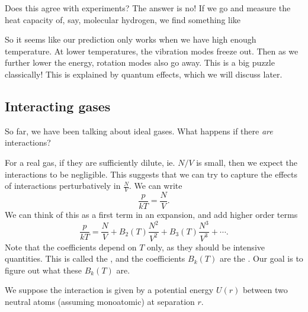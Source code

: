 \documentclass[a4paper]{article}
\begin{document}
Does this agree with experiments? The answer is no! If we go and measure the heat capacity of, say, molecular hydrogen, we find something like
\begin{center}
\end{center}
So it seems like our prediction only works when we have high enough temperature. At lower temperatures, the vibration modes freeze out. Then as we further lower the energy, rotation modes also go away. This is a big puzzle classically! This is explained by quantum effects, which we will discuss later.

\subsection{Interacting gases}
So far, we have been talking about ideal gases. What happens if there \emph{are} interactions?

For a real gas, if they are sufficiently dilute, ie. $N/V$ is small, then we expect the interactions to be negligible. This suggests that we can try to capture the effects of interactions perturbatively in $\frac{N}{V}$. We can write
\[
  \frac{p}{kT} = \frac{N}{V}.
\]
We can think of this as a first term in an expansion, and add higher order terms
\[
  \frac{p}{kT} = \frac{N}{V} + B_2(T) \frac{N^2}{V^2} + B_3 (T) \frac{N^3}{V^3} + \cdots.
\]
Note that the coefficients depend on $T$ only, as they should be intensive quantities. This is called the , and the coefficients $B_k(T)$ are the . Our goal is to figure out what these $B_k(T)$ are.

We suppose the interaction is given by a potential energy $U(r)$ between two neutral atoms (assuming monoatomic) at separation $r$.
\end{document}
